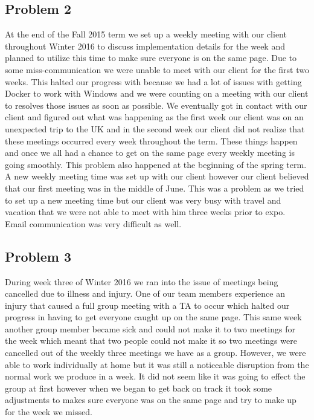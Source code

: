 \documentclass[draftclsnofoot,10pt,onecolumn]{IEEEtran} %
\begin{document}
\subsection{Problem 2}
At the end of the Fall 2015 term we set up a weekly meeting with our client
throughout Winter 2016 to discuss implementation details for the week and
planned to utilize this time to make sure everyone is on the same page. Due to
some miss-communication we were unable to meet with our client for the first two
weeks. This halted our progress with because we had a lot of issues with getting
Docker to work with Windows and we were counting on a meeting with our client to
resolves those issues as soon as possible. We eventually got in contact with our
client and figured out what was happening as the first week our client was on an
unexpected trip to the UK and in the second week our client did not realize that
these meetings occurred every week throughout the term. These things happen and
once we all had a chance to get on the same page every weekly meeting is going
smoothly. This problem also happened at the beginning of the spring term. A new
weekly meeting time was set up with our client however our client believed that
our first meeting was in the middle of June. This was a problem as we tried to
set up a new meeting time but our client was very busy with travel and vacation
that we were not able to meet with him three weeks prior to expo. Email communication
was very difficult as well.

\subsection{Problem 3}
During week three of Winter 2016 we ran into the issue of meetings being
cancelled due to illness and injury. One of our team members experience an injury
that caused a full group meeting with a TA to occur which halted our progress in
having to get everyone caught up on the same page. This same week another group
member became sick and could not make it to two meetings for the week which
meant that two people could not make it so two meetings were cancelled out of the
weekly three meetings we have as a group. However, we were
able to work individually at home but it was still a noticeable disruption from
the normal work we produce in a week. It did not seem like it was going to
effect the group at first however when we began to get back on track it took
some adjustments to makes sure everyone was on the same page and try to make up
for the week we missed.
\end{document}
